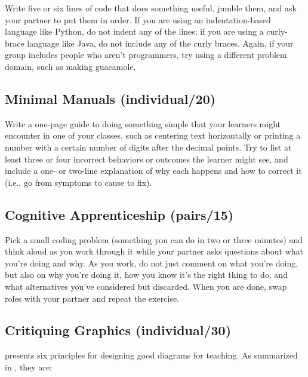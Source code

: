 Write five or six lines of code that does something useful, jumble them,
and ask your partner to put them in order. If you are using an
indentation-based language like Python, do not indent any of the lines;
if you are using a curly-brace language like Java, do not include any of
the curly braces. Again, if your group includes people who aren't
programmers, try using a different problem domain, such as making
guacamole.

\subsection*{Minimal Manuals (individual/20)}

Write a one-page guide to doing something simple that your learners
might encounter in one of your classes, such as centering text
horizontally or printing a number with a certain number of digits after
the decimal points. Try to list at least three or four incorrect
behaviors or outcomes the learner might see, and include a one- or
two-line explanation of why each happens and how to correct it (i.e., go
from symptoms to cause to fix).

\subsection*{Cognitive Apprenticeship (pairs/15)}

Pick a small coding problem (something you can do in two or three
minutes) and think aloud as you work through it while your partner asks
questions about what you're doing and why. As you work, do not just
comment on what you're doing, but also on why you're doing it, how you
know it's the right thing to do, and what alternatives you've considered
but discarded. When you are done, swap roles with your partner and
repeat the exercise.

\subsection*{Critiquing Graphics (individual/30)}

\cite{Maye2009} presents six principles for designing good diagrams
for teaching. As summarized in \cite{Mill2016a}, they are:

